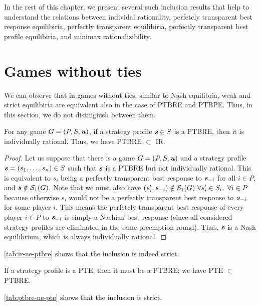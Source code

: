 In the rest of this chapter, we present several such inclusion results that help to understand the relations between individal rationality, perfetcly transparent best response equilibiria, perfectly transparent equilibiria, perfectly transparent best profile equilibiria, and minimax rationalizibility.

\section{Games without ties}
We can observe that in games without ties, similar to Nash equilibria, weak and strict equilibiria are equivalent also in the case of PTBRE and PTBPE.
Thus, in this section, we do not distingiush between them.

\begin{lemma}
	For any game $G = (P, S, \boldsymbol{\mathit{u}})$, if a strategy profile $\boldsymbol{\mathit{s}} \in S$ is a PTBRE, then it is individually rational.
	Thus, we have PTBRE $\subset$ IR.
\end{lemma}

\begin{proof}
	Let us suppose that there is a game $G = (P, S, \boldsymbol{\mathit{u}})$ and a strategy profile $\boldsymbol{\mathit{s}} = (s_1, \dots, s_n) \in S$ such that $\boldsymbol{\mathit{s}}$ is a PTBRE but not individually rational.
	This is equivalent to $s_i$ being a perfectly transparent best response to $\boldsymbol{\mathit{s}}_{-i}$ for all $i \in P$, and $\boldsymbol{\mathit{s}} \notin \mathcal{S}_1(G)$.
	Note that we must also have $(s_i', \boldsymbol{\mathit{s}}_{-i}) \notin \mathcal{S}_1(G)\ \forall s_i' \in S_i,\ \forall i \in P$ because otherwise $s_i$ would not be a perfectly transparent best response to $\boldsymbol{\mathit{s}}_{-i}$ for some player $i$.
	This means the perfetcly transparent best response of every player $i \in P$ to $\boldsymbol{\mathit{s}}_{-i}$ is simply a Nashian best response (since all considered strategy profiles are eliminated in the same preemption round).
	Thus, $\boldsymbol{\mathit{s}}$ is a Nash equilibrium, which is always individually rational.
\end{proof}

\begin{remark}
	\autoref{tab:ir-ne-ptbre} shows that the inclusion is indeed strict.
\end{remark}

\begin{observation}
	\label{th:ptbre-subset-pte}
	If a strategy profile is a PTE, then it must be a PTBRE; we have PTE $\subset$ PTBRE.
\end{observation}

\begin{remark}
	\autoref{tab:ptbre-ne-pte} shows that the inclusion is strict.
\end{remark}


